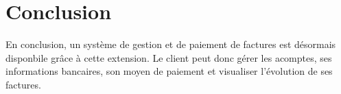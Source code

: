 \section{Conclusion}

\begin{flushleft}
En conclusion, un système de gestion et de paiement de factures est désormais disponbile grâce à cette extension. Le client peut donc gérer les acomptes, ses informations bancaires, son moyen de paiement et visualiser l'évolution de ses factures.
\end{flushleft}
